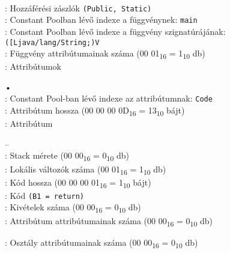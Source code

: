 \begin{compactitem}
\begin{compactitem}
\begin{compactitem}
    \end{compactitem}
	\item {}     \\
    : Hozzáférési zászlók \lstinline{(Public, Static)} \\
    : Constant Poolban lévő indexe a függvénynek: \lstinline{main} \\
    : Constant Poolban lévő indexe a függvény szignatúrájának: \lstinline{([Ljava/lang/String;)V} \\
    : Függvény attribútumainak száma (00 01\textsubscript{16} = 1\textsubscript{10} db) \\
    : Attribútumok
    \begin{compactitem}
        \setlength\itemsep{-5px}
        \item[•]    \\
        : Constant Pool-ban lévő indexe az attribútumnak: \lstinline{Code} \\
        : Attribútum hossza (00 00 00 0D\textsubscript{16} = 13\textsubscript{10} bájt) \\
        : Attribútum
            \begin{compactitem}
            \setlength\itemsep{0px}
                \item[–]       \\
                : Stack mérete (00 00\textsubscript{16} = 0\textsubscript{10} db) \\
                : Lokális változók száma (00 01\textsubscript{16} = 1\textsubscript{10} db) \\
                : Kód hossza (00 00 00 01\textsubscript{16} = 1\textsubscript{10} bájt) \\
                : Kód \lstinline{(B1 = return)}  \\
                : Kivételek száma (00 00\textsubscript{16} = 0\textsubscript{10} db) \\
                : Attribútum attribútumainak száma (00 00\textsubscript{16} = 0\textsubscript{10} db)
        \end{compactitem}
    \end{compactitem}
\end{compactitem}
\item {}: Osztály attribútumainak száma (00 00\textsubscript{16} = 0\textsubscript{10} db)
\end{compactitem}


